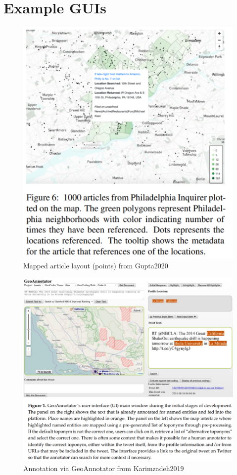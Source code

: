 \section{Example GUIs}
\begin{figure}[H]
	\centering
	\includegraphics[width=.9\linewidth]{images/gupta2020_figure_6_mapped_article_layout.png}
	\caption{Mapped article layout (points) from Gupta2020}%
	\label{fig:gupta2020_f6}
\end{figure}

\begin{figure}[H]
	\centering
	\includegraphics[width=.9\linewidth]{images/karimzadeh2019_figure1.png}
	\caption{Annotation via GeoAnnotator from Karimzadeh2019}%
	\label{fig:karimzadeh2019_f1}
\end{figure}

